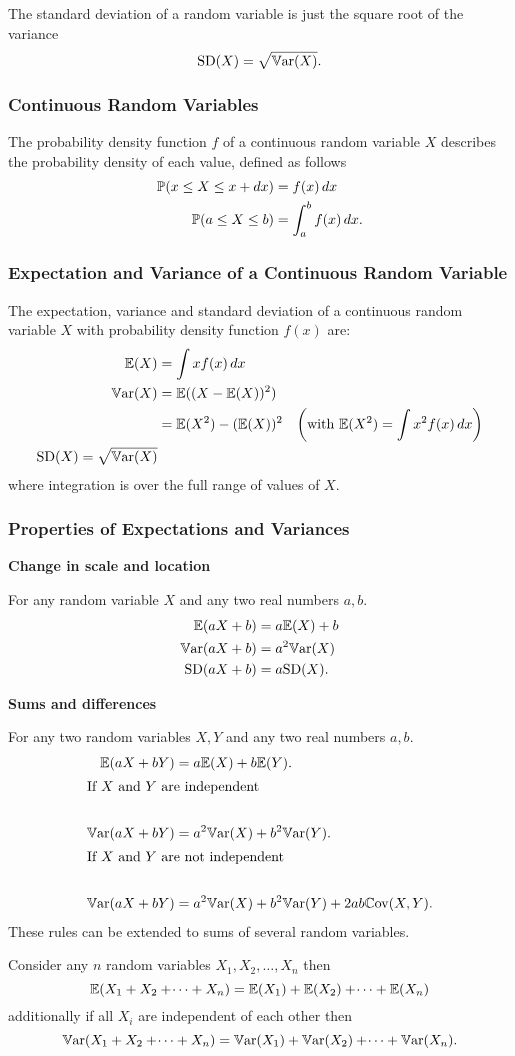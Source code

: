 \documentclass[10pt, a4paper]{article}
\begin{document}
The standard deviation of a random variable is just the square root of the variance
\[
\mathrm{SD}(X) = \sqrt{\Var(X)}.
\]

\subsubsection{Continuous Random Variables}
The probability density function $f$ of a continuous random variable $X$ describes the probability density of each value,
defined as follows
\begin{align*}
    \P(x \leq X \leq x + dx) &= f(x)\,dx \\
    \P(a \leq X \leq b) &= \int_{a}^{b}f(x)\,dx.
\end{align*}

\subsubsection{Expectation and Variance of a Continuous Random Variable}
The expectation,
variance and standard deviation of a continuous random variable $X$ with probability density function $f(x)$ are:
\begin{align*}
    \E(X) &= \int xf(x)\,dx \\
    \Var(X) &= \E((X - \E(X)) ^ 2) \\
    &= \E(X ^ 2) - (\E(X)) ^ 2 &\left(\text{with } \E(X ^ 2) = \int x ^ 2f(x)\,dx\right) \\
    \mathrm{SD}(X) = \sqrt{\Var(X)}
\end{align*}
where integration is over the full range of values of $X$.

\subsubsection{Properties of Expectations and Variances}
\textbf{Change in scale and location}

For any random variable $X$ and any two real numbers $a, b$.
\begin{align*}
    \E(aX + b) &= a\E(X) + b \\
    \Var(aX + b) &= a ^ 2\Var(X) \\
    \mathrm{SD}(aX + b) &= a\mathrm{SD}(X).
\end{align*}

\textbf{Sums and differences}

For any two random variables $X, Y$ and any two real numbers $a, b$.
\begin{align*}
    \E(aX + bY) &= a\E(X) + b\E(Y). \\
    \intertext{If $X$ and $Y$ are independent} \\
    \Var(aX + bY) &= a ^ 2\Var(X) + b ^ 2\Var(Y). \\
    \intertext{If $X$ and $Y$ are not independent} \\
    \Var(aX + bY) &= a ^ 2\Var(X) + b ^ 2\Var(Y) + 2ab\Cov(X, Y).
\end{align*}
These rules can be extended to sums of several random variables.

Consider any $n$ random variables $X_1, X_2, \dotsc, X_n$ then
\[
\E(X_1 + X_2 + \dotsi + X_n) = \E(X_1) + \E(X_2) + \dotsi + \E(X_n)
\]
additionally if all $X_i$ are independent of each other then
\[
\Var(X_1 + X_2 + \dotsi + X_n) = \Var(X_1) + \Var(X_2) + \dotsi + \Var(X_n).
\]
\end{document}
